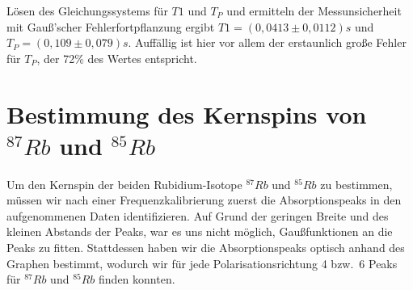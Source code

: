 \documentclass[bigchapter,colorback,accentcolor=tud4b,linedtoc,11pt]{tudreport}
\begin{document}
Lösen des Gleichungssystems für $T1$ und $T_P$ und ermitteln der
Messunsicherheit mit Gauß'scher Fehlerfortpflanzung ergibt $T1=(0,0413 \pm
0,0112)s$ und $T_P=(0,109 \pm 0,079)s$. Auffällig ist hier vor allem der
erstaunlich große Fehler für $T_P$, der 72\% des Wertes entspricht.

\section{Bestimmung des Kernspins von $^{87}Rb$ und $^{85}Rb$}
Um den Kernspin der beiden Rubidium-Isotope $^{87}Rb$ und $^{85}Rb$ zu
bestimmen, müssen wir nach einer Frequenzkalibrierung zuerst die
Absorptionspeaks in den aufgenommenen Daten identifizieren. Auf Grund der
geringen Breite und des kleinen Abstands der Peaks, war es uns nicht möglich,
Gaußfunktionen an die Peaks zu fitten. Stattdessen haben wir die Absorptionspeaks
optisch anhand des Graphen bestimmt, wodurch wir für jede Polarisationsrichtung
4 bzw.\ 6 Peaks für $^{87}Rb$ und $^{85}Rb$ finden konnten.
\end{document}
